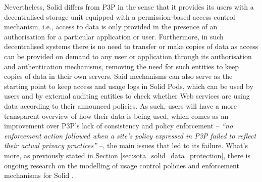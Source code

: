 Nevertheless, Solid differs from P3P in the sense that it provides its users with a decentralised storage unit equipped with a permission-based access control mechanism, i.e., access to data is only provided in the presence of an authorisation for a particular application or user.
Furthermore, in such decentralised systems there is no need to transfer or make copies of data as access can be provided on demand to any user or application through its authorisation and authentication mechanisms, removing the need for such entities to keep copies of data in their own servers.
Said mechanisms can also serve as the starting point to keep access and usage logs in Solid Pods, which can be used by users and by external auditing entities to check whether Web services are using data according to their announced policies.
As such, users will have a more transparent overview of how their data is being used, which comes as an improvement over P3P’s lack of consistency and policy enforcement -- \textit{``no enforcement action followed when a site's policy expressed in P3P failed to reflect their actual privacy practices''} \citep{cranor_platform_2002} --, the main issues that led to its failure.
What's more, as previously stated in Section \ref{sec:sota_solid_data_protection}, there is ongoing research on the modelling of usage control policies \citep{akaichi_gucon_2023} and enforcement mechanisms for Solid \citep{slabbinck_rulebased_2023}.


